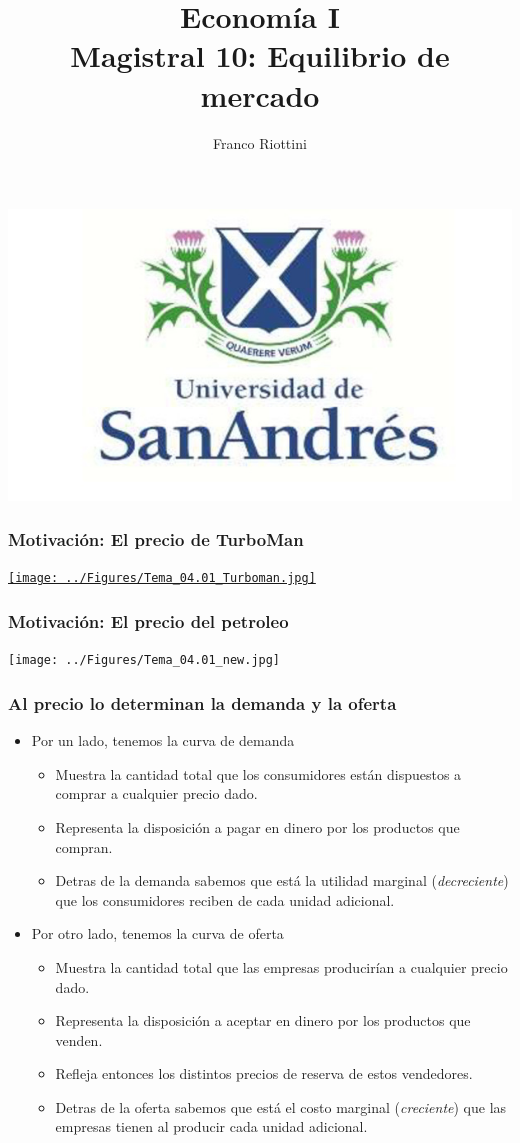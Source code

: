 \documentclass{beamer}
\title[Economía I]{Economía I \vspace{4mm}
\\ Magistral 10: Equilibrio de mercado}
\date{}
\author[Riottini]{Franco Riottini}
\institute[]{Universidad de San Andrés}
\begin{document}
\begin{frame}
\titlepage
\centering
\includegraphics[scale=0.2]{../Figures/logoUDESA.jpg} 
\end{frame} 

\begin{frame}
\frametitle{Motivación: El precio de TurboMan}
\centering
\href{https://www.youtube.com/watch?v=LCK5jetqpeM}{\texttt{[image: ../Figures/Tema\_04.01\_Turboman.jpg]}}
\end{frame}

\begin{frame}
\frametitle{Motivación: El precio del petroleo}
\centering
\texttt{[image: ../Figures/Tema\_04.01\_new.jpg]}
\end{frame} 

\begin{frame}
\frametitle{Al precio lo determinan la demanda y la oferta}
\begin{itemize}
    \item Por un lado, tenemos la curva de demanda
    \begin{itemize}
        \item Muestra la cantidad total que los consumidores están dispuestos a comprar a cualquier precio dado.
        \item Representa la disposición a pagar en dinero por los productos que compran.
        \item Detras de la demanda sabemos que está la utilidad marginal (\textit{decreciente}) que los consumidores reciben de cada unidad adicional.
    \end{itemize}
    \item Por otro lado, tenemos la curva de oferta
    \begin{itemize}
        \item Muestra la cantidad total que las empresas producirían a cualquier precio dado.
        \item Representa la disposición a aceptar en dinero por los productos que venden.
        \item Refleja entonces los distintos precios de reserva de estos vendedores.
        \item Detras de la oferta sabemos que está el costo marginal (\textit{creciente}) que las empresas tienen al producir cada unidad adicional.
        \end{itemize}
\end{itemize}
\end{frame}
\end{document}
